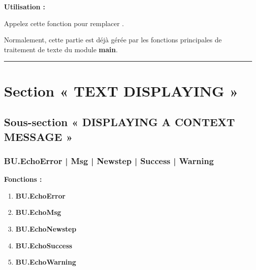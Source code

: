 \documentclass[a4paper,10pt]{article}
\begin{document}
\begin{justify}
    \textbf{Utilisation :}

    Appelez cette fonction pour remplacer .
\end{justify}

\begin{justify}
    Normalement, cette partie est déjà gérée par les fonctions principales de traitement de texte du module \textbf{main}.
\end{justify}





\color{sec1}\par\noindent\rule{\textwidth}{0.4pt}\color{text}

\color{sec1}
\section{Section « TEXT DISPLAYING »}\color{text}

\color{sec2}
\subsection{Sous-section « DISPLAYING A CONTEXT MESSAGE »}\color{text}

\color{sec3}
\subsubsection{BU.EchoError | Msg | Newstep | Success | Warning}\color{text}

\begin{justify}
    \textbf{Fonctions :}
    \begin{enumerate}
        \item \textbf{\color{red}BU.EchoError}
        \item \textbf{\color{text}BU.EchoMsg}
        \item \textbf{\color{orange}BU.EchoNewstep}
        \item \textbf{\color{green}BU.EchoSuccess}
        \item \textbf{\color{yellow}BU.EchoWarning}
    \end{enumerate}
\end{justify}
\end{document}
